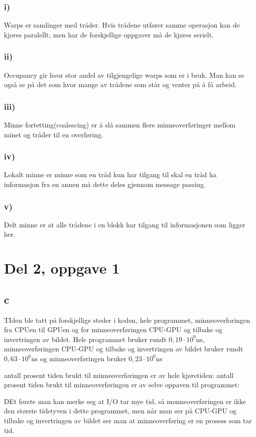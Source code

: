 \documentclass[12pt, a4paper]{article} %
\begin{document}
\subsubsection*{i)}
Warps er samlinger med tråder. Hvis trådene utfører samme operasjon kan de kjøres paralellt, men har de forskjellige oppgaver må de kjøres serielt.
\subsubsection*{ii)}
Occupancy gir hvor stor andel av tilgjengelige warps som er i bruk. Man kan se også se på det som hvor mange av trådene som står og venter på å få arbeid.
\subsubsection*{iii)}
Minne fortetting(coalescing) er å slå sammen flere minneoverføringer mellom minet og tråder til en overføring.
\subsubsection*{iv)}
Lokalt minne er minne som en tråd kun har tilgang til skal en tråd ha informasjon fra en annen må dette deles gjennom message passing.
\subsubsection*{v)}
Delt minne er at alle trådene i en blokk har tilgang til informasjonen som ligger her.

\section*{Del 2, oppgave 1}
\subsection*{c}
TIden ble tatt på forskjellige steder i koden, hele programmet, minneoverforingen fra CPUen til GPUen og for minneoverføringen CPU-GPU og tilbake og invertringen av bildet. Hele programmet bruker rundt $0,19\cdot 10^9$ns, minneoverføringen CPU-GPU og tilbake og invertringen av bildet bruker rundt $0,63\cdot 10^6$ns og minneoverføringen bruker $0,23 \cdot 10^6$ns

antall prosent tiden brukt til minneoverføringen er av hele kjøretiden: 
antall prosent tiden brukt til minneoverføringen er av selve oppaven til programmet:

DEt første man kan merke seg at I/O tar mye tid, så monneoverføringen er ikke den største tidstyven i dette programmet, men når man ser på CPU-GPU og tilbake og invertringen av bildet ser man at minneoverføring er en prosess som tar tid.
\end{document}
